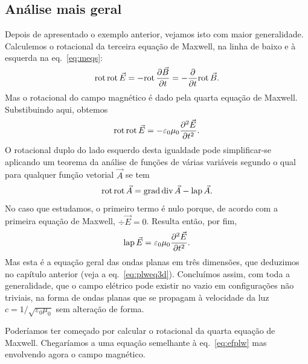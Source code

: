 \subsection{Análise mais geral}
Depois de apresentado o exemplo anterior, vejamos isto com maior generalidade.
Calculemos o rotacional da terceira equação de Maxwell, na linha de baixo e à
esquerda na eq.~\eqref{eq:meqs}:
\begin{equation*}
  \rot\rot\vec E=-\rot\pd{\vec B}{t}=-\pd{}{t}\rot\vec B.
\end{equation*}
Mas o rotacional do campo magnético é dado pela quarta equação de Maxwell.
Substibuindo aqui, obtemos
\begin{equation*}
  \rot\rot\vec E=-\varepsilon_0\mu_0\pdd{\vec E}{t}.
\end{equation*}
O rotacional duplo do lado esquerdo desta igualdade pode simplificar-se
aplicando um teorema da análise de funções de várias variáveis segundo o qual
para qualquer função vetorial $\vec A$ se tem
\begin{equation*}
  \rot\rot\vec A=\grad\div\vec A - \lap\vec A.
\end{equation*}
No caso que estudamos, o primeiro termo é nulo porque, de acordo com a primeira
equação de Maxwell, $\div \vec E=0$. Resulta então, por fim,
\begin{equation}\label{eq:efplw}
  \lap\vec E=\varepsilon_0\mu_0\pdd{\vec E}{t}.
\end{equation}
Mas esta é a equação geral das ondas planas em três dimensões, que deduzimos no
capítulo anterior (veja a eq.~\eqref{eq:plweq3d}). Concluímos assim, com toda a
generalidade, que o campo elétrico pode existir no vazio em configurações não
triviais, na forma de ondas planas que se propagam à velocidade da luz
$c=1/\sqrt{\varepsilon_0\mu_0}$ sem alteração de forma.

Poderíamos ter começado por calcular o rotacional da quarta equação de Maxwell.
Chegaríamos a uma equação semelhante à eq.~\eqref{eq:efplw} mas envolvendo agora
o campo magnético.

